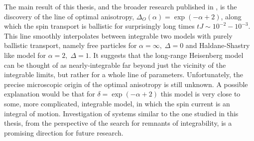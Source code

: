 The main result of this thesis, and the broader research published in \autocite{Mierzejewski2023}, is the
discovery of the line of optimal anisotropy, \(\Delta_{O}(\alpha) = \exp(-\alpha +2)\),
along which the spin transport is ballistic for surprisingly long times \(tJ \sim 10^{-2} -10^{-3}\).
This line smoothly interpolates between integrable two models with purely ballistic
transport, namely free particles for \(\alpha =\infty,\; \Delta =0\) and Haldane-Shastry
like model for \(\alpha  = 2,\; \Delta  = 1\). It suggests that the long-range Heisenberg
model can be thought of as nearly-integrable far beyond just the vicinity of the
integrable limits, but rather for a whole line of parameters. Unfortunately, the precise
microscopic origin of the optimal anisotropy is still unknown. A possible explanation
would be that for \(\delta = \exp(-\alpha  + 2)\) this model is very close to some,
more complicated, integrable model, in which the spin current is an integral of motion.
Investigation of systems similar to the one studied in this thesis, from the perspective
of the search for remnants of integrability, is a promising direction for future research.
